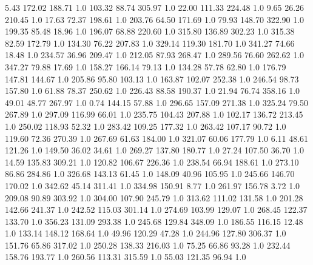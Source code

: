       5.43    172.02    188.71  1.0
    103.32     88.74    305.97  1.0
     22.00    111.33    224.48  1.0
      9.65     26.26    210.45  1.0
     17.63     72.37    198.61  1.0
    203.76     64.50    171.69  1.0
     79.93    148.70    322.90  1.0
    199.35     85.48     18.96  1.0
    196.07     68.88    220.60  1.0
    315.80    136.89    302.23  1.0
    315.38     82.59    172.79  1.0
    134.30     76.22    207.83  1.0
    329.14    119.30    181.70  1.0
    341.27     74.66     18.48  1.0
    234.57     36.96    209.47  1.0
    212.05     87.93    268.47  1.0
    289.56     76.60    262.62  1.0
    347.27     79.88     17.69  1.0
    158.27    166.14     79.13  1.0
    134.28     57.78     62.80  1.0
    176.79    147.81    144.67  1.0
    205.86     95.80    103.13  1.0
    163.87    102.07    252.38  1.0
    246.54     98.73    157.80  1.0
     61.88     78.37    250.62  1.0
    226.43     88.58    190.37  1.0
     21.94     76.74    358.16  1.0
     49.01     48.77    267.97  1.0
      0.74    144.15     57.88  1.0
    296.65    157.09    271.38  1.0
    325.24     79.50    267.89  1.0
    297.09    116.99     66.01  1.0
    235.75    104.43    207.88  1.0
    102.17    136.72    213.45  1.0
    250.02    118.93     52.32  1.0
    283.42    109.25    177.32  1.0
    263.42    107.17     90.72  1.0
    119.60     72.36    270.39  1.0
    267.69     61.63    184.00  1.0
    321.07     60.06    177.79  1.0
      6.11     48.61    121.26  1.0
    149.50     36.02     34.61  1.0
    269.27    137.80    180.77  1.0
     27.24    107.50     36.70  1.0
     14.59    135.83    309.21  1.0
    120.82    106.67    226.36  1.0
    238.54     66.94    188.61  1.0
    273.10     86.86    284.86  1.0
    326.68    143.13     61.45  1.0
    148.09     40.96    105.95  1.0
    245.66    146.70    170.02  1.0
    342.62     45.14    311.41  1.0
    334.98    150.91      8.77  1.0
    261.97    156.78      3.72  1.0
    209.08     90.89    303.92  1.0
    304.00    107.90    245.79  1.0
    313.62    111.02    131.58  1.0
    201.28    142.66    241.37  1.0
    242.52    115.03    301.14  1.0
    274.69    103.99    129.07  1.0
    268.45    122.37    133.70  1.0
    356.23    131.09    293.38  1.0
    245.68    129.84    348.09  1.0
    186.55    116.15     12.48  1.0
    133.14    148.12    168.64  1.0
     49.96    120.29     47.28  1.0
    244.96    127.80    306.37  1.0
    151.76     65.86    317.02  1.0
    250.28    138.33    216.03  1.0
     75.25     66.86     93.28  1.0
    232.44    158.76    193.77  1.0
    260.56    113.31    315.59  1.0
     55.03    121.35     96.94  1.0
